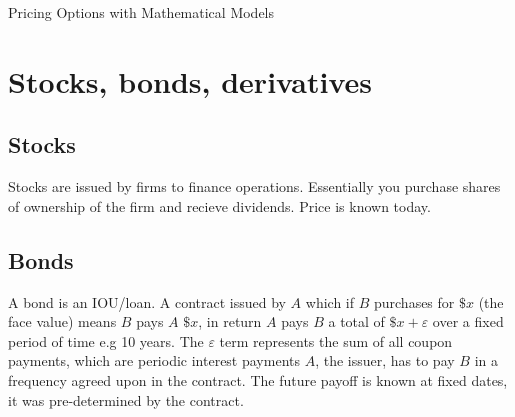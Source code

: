 \documentclass[9pt]{extarticle}
\begin{document}
\begin{titlepage}
    Pricing Options with Mathematical Models
\end{titlepage}
\tableofcontents
\newpage

\section{Stocks, bonds, derivatives}


\subsection{Stocks}

Stocks are issued by firms to finance operations. Essentially 
you purchase shares of ownership of the firm and recieve dividends. Price 
is known today.

\subsection{Bonds}

A bond is an IOU/loan. A contract issued by 
$A$ which if $B$ purchases for $\$x$ (the face value) means $B$ pays 
$A$ $\$x$, in return $A$ 
pays $B$ a total of $\$x+\varepsilon$ over a fixed period of time 
e.g 10 years. The $\varepsilon$ term represents the 
sum of all coupon payments, which are periodic interest payments 
$A$, the issuer, has to pay $B$ in a 
frequency agreed upon in the contract.
The future payoff 
is known at fixed dates, it was pre-determined 
by the contract.
\end{document}
